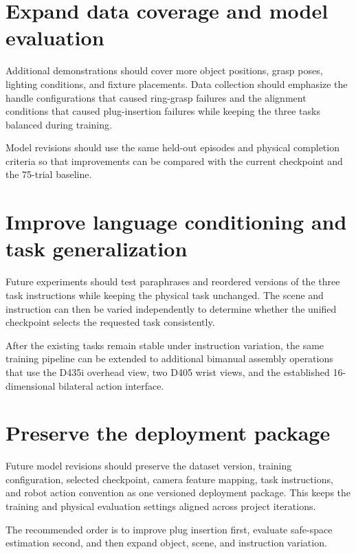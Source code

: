 \section{Expand data coverage and model evaluation}

Additional demonstrations should cover more object positions, grasp poses,
lighting conditions, and fixture placements. Data collection should emphasize
the handle configurations that caused ring-grasp failures and the alignment
conditions that caused plug-insertion failures while keeping the three tasks
balanced during training.

Model revisions should use the same held-out episodes and physical completion
criteria so that improvements can be compared with the current checkpoint and
the 75-trial baseline.

\section{Improve language conditioning and task generalization}

Future experiments should test paraphrases and reordered versions of the three
task instructions while keeping the physical task unchanged. The scene and
instruction can then be varied independently to determine whether the unified
checkpoint selects the requested task consistently.

After the existing tasks remain stable under instruction variation, the same
training pipeline can be extended to additional bimanual assembly operations
that use the D435i overhead view, two D405 wrist views, and the established
16-dimensional bilateral action interface.

\section{Preserve the deployment package}

Future model revisions should preserve the dataset version, training
configuration, selected checkpoint, camera feature mapping, task instructions,
and robot action convention as one versioned deployment package. This keeps the
training and physical evaluation settings aligned across project iterations.

The recommended order is to improve plug insertion first, evaluate safe-space
estimation second, and then expand object, scene, and instruction variation.
